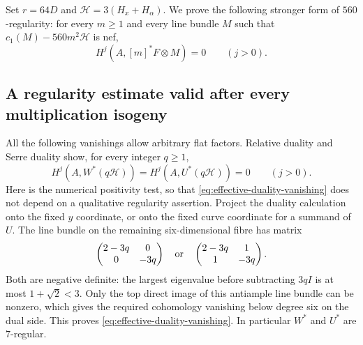Set $r=64D$ and $\mathcal H=3(H_x+H_\alpha)$. We prove the following stronger form of $560$-regularity: for every $m\ge1$ and every line bundle $M$ such that $c_1(M)-560m^2\mathcal H$ is nef,
\begin{equation}\label{eq:effective-vanishing}
 H^j(A,[m]^*F\otimes M)=0\qquad(j>0).
\end{equation}
\subsection{A regularity estimate valid after every multiplication isogeny}
All the following vanishings allow arbitrary flat factors.
Relative duality and Serre duality show, for every integer $q\ge1$,
\begin{equation}\label{eq:effective-duality-vanishing}
 H^j(A,W^*(q\mathcal H))=H^j(A,U^*(q\mathcal H))=0
 \qquad(j>0).                                             
\end{equation}
Here is the numerical positivity test, so that \eqref{eq:effective-duality-vanishing} does not
depend on a qualitative regularity assertion. Project the duality
calculation onto the fixed $y$ coordinate, or onto the fixed curve
coordinate for a summand of $U$. The line bundle on the remaining
six-dimensional fibre has matrix
\[
 \begin{pmatrix}2-3q&0\\0&-3q\end{pmatrix}
 \quad\hbox{or}\quad
 \begin{pmatrix}2-3q&1\\1&-3q\end{pmatrix}.
\]
Both are negative definite: the largest eigenvalue before
subtracting $3qI$ is at most $1+\sqrt2<3$. Only the top direct
image of this antiample line bundle can be nonzero, which gives
the required cohomology vanishing below degree six on the dual
side. This proves \eqref{eq:effective-duality-vanishing}. In particular $W^*$ and $U^*$ are
$7$-regular.


